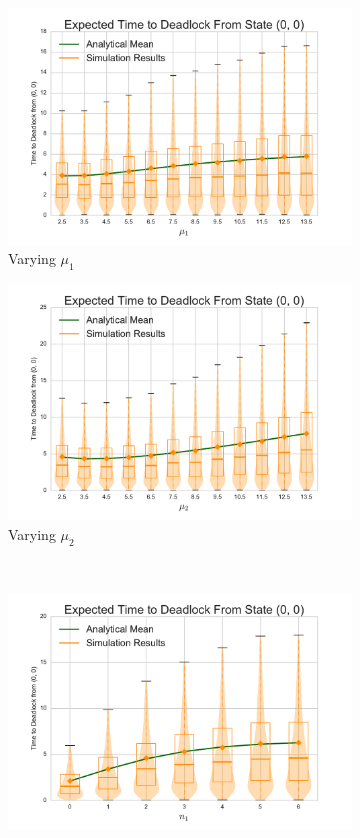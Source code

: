 \documentclass{article}
\numberwithin{equation}{section}
\begin{document}
\begin{figure}[!htbp]
\begin{center}
\begin{subfigure}[b]{0.35\textwidth}
  \includegraphics[width=\textwidth]{images/vary_mu1fb}
  \caption{Varying $\mu_1$}
  \label{fig:timestodeadlockfb_mu1}
\end{subfigure}
\begin{subfigure}[b]{0.35\textwidth}
  \includegraphics[width=\textwidth]{images/vary_mu2fb}
  \caption{Varying $\mu_2$}
  \label{fig:timestodeadlockfb_mu2}
\end{subfigure}\\
\begin{subfigure}[b]{0.35\textwidth}
  \includegraphics[width=\textwidth]{images/vary_n1fb}

\end{subfigure}
\end{center}
\end{figure}
\end{document}
